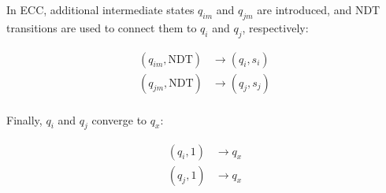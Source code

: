 \documentclass{ieeeojies}
\begin{document}
In ECC, additional intermediate states $q_{im}$ and $q_{jm}$ are introduced, and NDT transitions are used to connect them to $q_i$ and $q_j$, respectively:


\[
\begin{aligned}
(q_{im}, \text{NDT}) & \rightarrow (q_i, s_i) \\
(q_{jm}, \text{NDT}) & \rightarrow (q_j, s_j) \\
\end{aligned}
\]


Finally, $q_i$ and $q_j$ converge to $q_x$:


\[
\begin{aligned}
(q_i, \text{1}) & \rightarrow q_x \\
(q_j, \text{1}) & \rightarrow q_x \\
\end{aligned}
\] 
\end{document}
